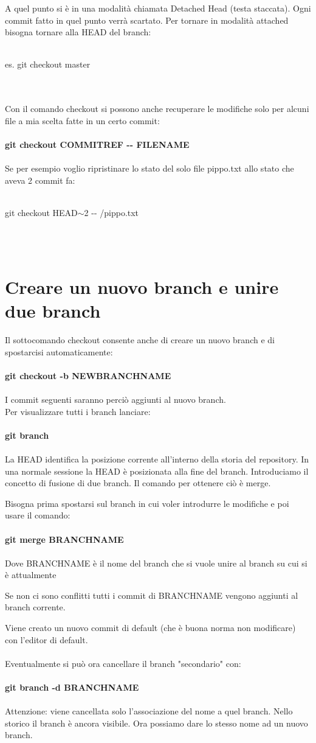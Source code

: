 \documentclass[a4paper,12pt]{report}
\begin{document}
A quel punto si è in una modalità chiamata Detached Head (testa staccata). Ogni commit fatto in quel punto verrà scartato. Per tornare in modalità attached bisogna tornare alla HEAD del branch:
\\\\
\centerline{es. git checkout master}
\\\\
Con il comando checkout si possono anche recuperare le modifiche solo per alcuni file a mia scelta fatte in un certo commit:
\\\\
\textbf{git checkout COMMITREF -{}- FILENAME}
\\\\
Se per esempio voglio ripristinare lo stato del solo file pippo.txt allo stato che aveva 2 commit fa:
\\\\
\centerline{git checkout HEAD$\sim$2 -{}- /pippo.txt}
\\\\
\chapter{Creare un nuovo branch e unire due branch}
Il sottocomando checkout consente anche di creare un nuovo branch e di spostarcisi automaticamente:
\\\\
\textbf{git checkout -b NEWBRANCHNAME}
\\\\
I commit seguenti saranno perciò aggiunti al nuovo branch.
\\
Per visualizzare tutti i branch lanciare:
\\\\
\textbf{git branch}
\\\\
La HEAD identifica la posizione corrente all'interno della storia del repository. In una normale sessione la HEAD è posizionata alla fine del branch.
Introduciamo il concetto di fusione di due branch. Il comando per ottenere ciò è merge.

Bisogna prima spostarsi sul branch in cui voler introdurre le modifiche e poi usare il comando:
\\\\
\textbf{git merge BRANCHNAME}
\\\\
Dove BRANCHNAME è il nome del branch che si vuole unire al branch su cui si è attualmente

Se non ci sono conflitti tutti i commit di BRANCHNAME vengono aggiunti al branch corrente.

Viene creato un nuovo commit di default (che è buona norma non modificare) con l'editor di default.
\\\\
Eventualmente si può ora cancellare il branch "secondario" con:
\\\\
\textbf{git branch -d BRANCHNAME}
\\\\
Attenzione: viene cancellata solo l'associazione del nome a quel branch. Nello storico il branch è ancora visibile. Ora possiamo dare lo stesso nome ad un nuovo branch.
\end{document}

